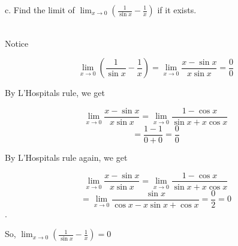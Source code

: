 c. Find the limit of $\lim_{x\rightarrow0}(\frac{1}{\sin x}-\frac{1}{x})$ if it exists.\\

\begin{solution}\renewcommand{\qedsymbol}{}\ \\
    Notice
    
    $$\lim_{x\rightarrow0}(\frac{1}{\sin x}-\frac{1}{x})=\lim_{x\rightarrow0}\frac{x-\sin x}{x\sin x}
    =\frac00$$
    
    By L'Hospitals rule, we get
    
    $$\lim_{x\rightarrow0}\frac{x-\sin x}{x\sin x}=\lim_{x\rightarrow0}\frac{1-\cos x}{\sin x+x\cos x}$$
    $$=\frac{1-1}{0+0}=\frac00$$
    
    By L'Hospitals rule again, we get
    
    $$\lim_{x\rightarrow0}\frac{x-\sin x}{x\sin x}=\lim_{x\rightarrow0}\frac{1-\cos x}{\sin x+x\cos x}$$
    $$=\lim_{x\rightarrow0}\frac{\sin x}{\cos x-x\sin x+\cos x}=\frac02=0$$.
    
    So, $\lim_{x\rightarrow0}(\frac{1}{\sin x}-\frac{1}{x})=0$

\end{solution}